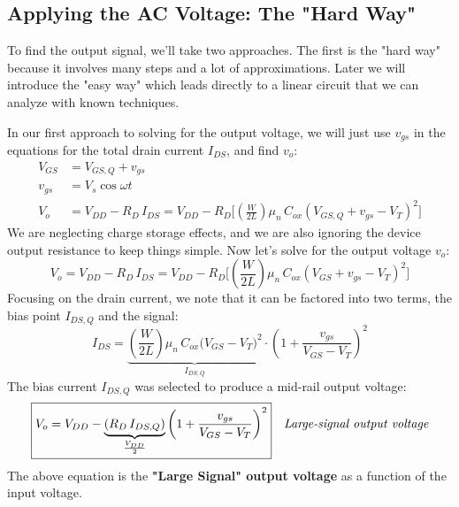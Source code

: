 \subsection{Applying the AC Voltage:  The "Hard Way"}
To find the output signal, we'll take two approaches.  The first is the "hard way" because it involves many steps and a lot of approximations.  Later we will introduce the "easy way" which leads directly to a linear circuit that we can analyze with known techniques.  

In our first approach to solving for the output voltage, we will just use $v_{gs}$ in the equations for the total drain current $I_{DS}$, and find $v_o$:
    \begin{align}
        V_{GS} &= V_{GS,Q} + v_{gs}\\[0.55cm]
        v_{gs} &= {V_s}\cos \omega t\\[0.25cm]
        V_o &= V_{DD} - R_D\,I_{DS} = V_{DD} - R_D \bigg[\left(\frac{W}{2L}\right)\mu_n\,C_{ox}{(V_{GS,Q} + v_{gs} - V_T)^2} \bigg]
    \end{align}
We are neglecting charge storage effects, and we are also ignoring the device output resistance to keep things simple.  Now let's solve for the output voltage $v_o$:
    \begin{equation}
        V_o = V_{DD} - R_D\,I_{DS} = V_{DD} - R_D \bigg[\left(\frac{W}{2L}\right)\mu_n\,C_{ox}{(V_{GS} + v_{gs} - V_T)^2} \bigg]
    \end{equation}
Focusing on the drain current, we note that it can be factored into two terms, the bias point $I_{DS,Q}$ and the signal:
    \begin{equation}
        I_{DS} = \underbrace{\left(\frac{W}{2L}\right)\mu_n\,C_{ox}{\big(V_{GS} - V_T\big)}^2}_{I_{DS,Q}}
                    \cdot {\left({1 + \frac{v_{gs}}{V_{GS} - V_T}} \right)}^2
    \end{equation}
The bias current $I_{DS,Q}$ was selected to produce a mid-rail output voltage:
    \begin{align}
        \Aboxed{V_o &= V_{DD} -\underbrace{(R_D\,I_{DS,Q})}_{\frac{V_{DD}}{2}} {\left(1 + \frac{v_{gs}}{V_{GS} - {V_T}} \right)}^2}
        & \textit{Large-signal output voltage}
    \end{align}
The above equation is the \textbf{"Large Signal" output voltage} as a function of the input voltage.
